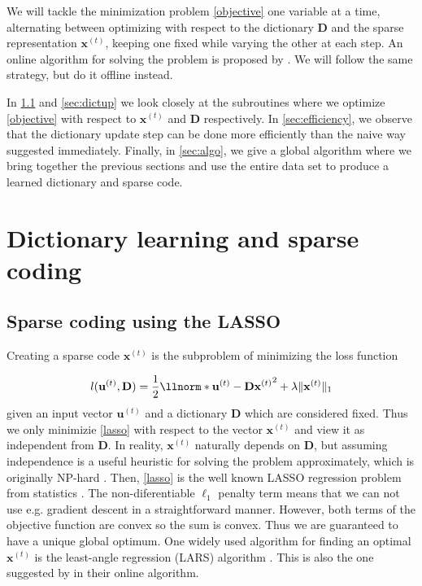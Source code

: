 \documentclass[a4paper, article, oneside, UKenglish]{memoir}
\newcommand{\0}{\mathbf{0}}
\newcommand{\1}{\mathbf{1}}
\newcommand{\D}{\mathbf{D}}
\newcommand{\xt}{\mathbf{x}^{(t)}}
\newcommand{\ut}{\mathbf{u}^{(t)}}
\newcommand{\norms}[2]{\lVert #1 \rVert_{#2}}
\begin{document}
We will tackle the minimization problem \eqref{objective} one variable at a time, alternating between optimizing with respect to the dictionary $\D$ and the sparse representation $\xt$, keeping one fixed while varying the other at each step. An online algorithm for solving the problem is proposed by \parencite{Mai+09}. We will follow the same strategy, but do it offline instead.

In \cref{sec:sparsecode} and \cref{sec:dictup} we look closely at the subroutines where we optimize \eqref{objective} with respect to $\xt$ and $\D$ respectively. In \cref{sec:efficiency}, we observe that the dictionary update step can be done more efficiently than the naive way suggested immediately. Finally, in \cref{sec:algo}, we give a global algorithm where we bring together the previous sections and use the entire data set to produce a learned dictionary and sparse code.

\chapter{Dictionary learning and sparse coding}

\section{Sparse coding using the LASSO} \label{sec:sparsecode}
Creating a sparse code $\xt$ is the subproblem of minimizing the loss function

\begin{equation} \label{lasso}
l(\ut, \D) = \frac{1}{2} \llnorm*{\ut - \D\xt}^2 + \lambda \norms{\xt}{1}
\end{equation}
%
given an input vector $\ut$ and a dictionary $\D$ which are considered fixed. Thus we only minimizie \eqref{lasso} with respect to the vector $\xt$ and view it as independent from $\D$. In reality, $\xt$ naturally depends on $\D$, but assuming independence is a useful heuristic for solving the problem approximately, which is originally NP-hard \parencite{Tillman15}. Then, \eqref{lasso} is the well known LASSO regression problem from statistics \parencite{Tibs96}. The non-diferentiable $\ell_1$ penalty term means that we can not use e.g. gradient descent in a straightforward manner. However, both terms of the objective function are convex so the sum is convex. Thus we are guaranteed to have a unique global optimum. One widely used algorithm for finding an optimal $\xt$ is the least-angle regression (LARS) algorithm \parencite{efron04}. This is also the one suggested by \parencite{Mai+09} in their online algorithm. 
\end{document}
